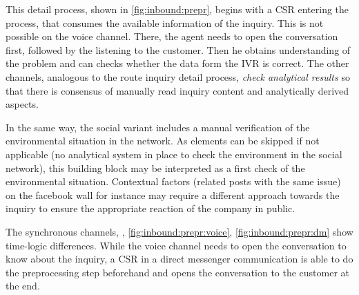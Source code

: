 This detail process, shown in \Fig \ref{fig:inbound:prepr}, begins with a \acrshort{CSR} entering the process, that consumes the available information of the inquiry. This is not possible on the voice channel. There, the agent needs to open the conversation first, followed by the listening to the customer. Then he obtains understanding of the problem and can checks whether the data form the \acrshort{IVR} is correct. The other channels, analogous to the route inquiry detail process, \textit{check analytical results} so that there is consensus of manually read inquiry content and analytically derived aspects.

In the same way, the social variant includes a manual verification of the environmental situation in the network. As elements can be skipped if not applicable (\ie no analytical system in place to check the environment in the social network), this building block may be interpreted as a first check of the environmental situation. Contextual factors (related posts with the same issue) on the facebook wall for instance may require a different approach towards the inquiry to ensure the appropriate reaction of the company in public.   

The synchronous channels, \ie, \Fig \ref{fig:inbound:prepr:voice}, \ref{fig:inbound:prepr:dm} show time-logic differences. While the voice channel needs to open the conversation to know about the inquiry, a \acrshort{CSR} in a direct messenger communication is able to do the preprocessing step beforehand and opens the conversation to the customer at the end. 

